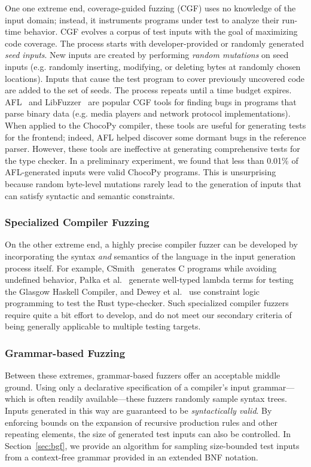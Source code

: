 \documentclass[conference]{IEEEtran}
\begin{document}
One one extreme end, coverage-guided fuzzing (CGF) uses no knowledge of the input domain; instead, it instruments programs under test to analyze their run-time behavior. CGF evolves a corpus of test inputs with the goal of maximizing code coverage. 
The process starts with developer-provided or randomly generated \emph{seed inputs}. New inputs are created by performing \emph{random mutations} on seed inputs (e.g. randomly inserting, modifying, or deleting bytes at randomly chosen locations). Inputs that cause the test program to cover previously uncovered code are added to the set of seeds. The process repeats until a time budget expires.
AFL~\cite{AFL} and LibFuzzer~\cite{libFuzzer} are popular CGF tools for finding bugs in programs that parse binary data (e.g. media players and network protocol implementations). When applied to the ChocoPy compiler, these tools are useful for generating tests for the frontend; indeed, AFL helped discover some dormant bugs in the reference parser. However, these tools are ineffective at generating comprehensive tests for the type checker. In a preliminary experiment, we found that less than 0.01\% of AFL-generated inputs were valid ChocoPy programs. This is unsurprising because random byte-level mutations rarely lead to the generation of inputs that can satisfy syntactic and semantic constraints.

\subsubsection{Specialized Compiler Fuzzing}

On the other extreme end, a highly precise compiler fuzzer can be developed by incorporating the syntax \emph{and} semantics of the language in the input generation process itself. For example, CSmith~\cite{Yang11} generates C programs while avoiding undefined behavior, Pa\l{}ka et al.~\cite{Palka11} generate well-typed lambda terms for testing the Glasgow Haskell Compiler, and Dewey et al.~\cite{Dewey15} use constraint logic programming to test the Rust type-checker. Such specialized compiler fuzzers require quite a bit effort to develop, and do not meet our secondary criteria of being generally applicable to multiple testing targets.

\subsubsection{Grammar-based Fuzzing}

Between these extremes, grammar-based fuzzers offer an acceptable middle ground. Using only a declarative specification of a compiler's input grammar---which is often readily available---these fuzzers randomly sample syntax trees. Inputs generated in this way are guaranteed to be \emph{syntactically valid}. By enforcing bounds on the expansion of recursive production rules and other repeating elements, the size of generated test inputs can also be controlled. In Section~\ref{sec:bgf}, we provide an algorithm for sampling size-bounded test inputs from a context-free grammar provided in an extended BNF notation.
\end{document}

